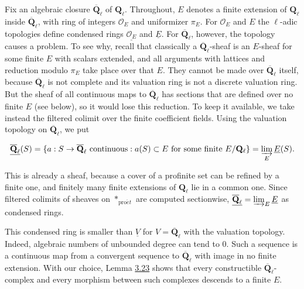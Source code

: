 \documentclass[11pt]{article}
\begin{document}
Fix an algebraic closure \(\overline{\mathbf Q}_\ell\) of \(\mathbf Q_\ell\). Throughout, \(E\) denotes a finite extension of \(\mathbf Q_\ell\) inside \(\overline{\mathbf Q}_\ell\), with ring of integers \(\mathcal O_E\) and uniformizer \(\pi_E\). For \(\mathcal O_E\) and \(E\) the \(\ell\)-adic topologies define condensed rings \(\underline{\mathcal O_E}\) and \(\underline E\). For \(\overline{\mathbf Q}_\ell\), however, the topology causes a problem. To see why, recall that classically a \(\overline{\mathbf Q}_\ell\)-sheaf is an \(E\)-sheaf for some finite \(E\) with scalars extended, and all arguments with lattices and reduction modulo \(\pi_E\) take place over that \(E\). They cannot be made over \(\overline{\mathbf Q}_\ell\) itself, because \(\overline{\mathbf Q}_\ell\) is not complete and its valuation ring is not a discrete valuation ring. But the sheaf of all continuous maps to \(\overline{\mathbf Q}_\ell\) has sections that are defined over no finite \(E\) (see below), so it would lose this reduction. To keep it available, we take instead the filtered colimit over the finite coefficient fields. Using the valuation topology on \(\overline{\mathbf Q}_\ell\), we put

\[
\underline{\overline{\mathbf Q}_\ell}(S)=
\{a:S\to\overline{\mathbf Q}_\ell\text{ continuous}:a(S)\subset E\text{ for some finite }E/\mathbf Q_\ell\}
=\varinjlim_E\underline E(S).
\]

This is already a sheaf, because a cover of a profinite set can be refined by a finite one, and finitely many finite extensions of \(\mathbf Q_\ell\) lie in a common one. Since filtered colimits of sheaves on \(*_{\mathrm{pro}\acute{e}t}\) are computed sectionwise, \(\underline{\overline{\mathbf Q}_\ell}=\varinjlim_E\underline E\) as condensed rings.

This condensed ring is smaller than \(\underline V\) for \(V=\overline{\mathbf Q}_\ell\) with the valuation topology. Indeed, algebraic numbers of unbounded degree can tend to \(0\). Such a sequence is a continuous map from a convergent sequence to \(\overline{\mathbf Q}_\ell\) with image in no finite extension. With our choice, Lemma \hyperref[bp265]{3.23} shows that every constructible \(\overline{\mathbf Q}_\ell\)-complex and every morphism between such complexes descends to a finite \(E\).


\end{document}
